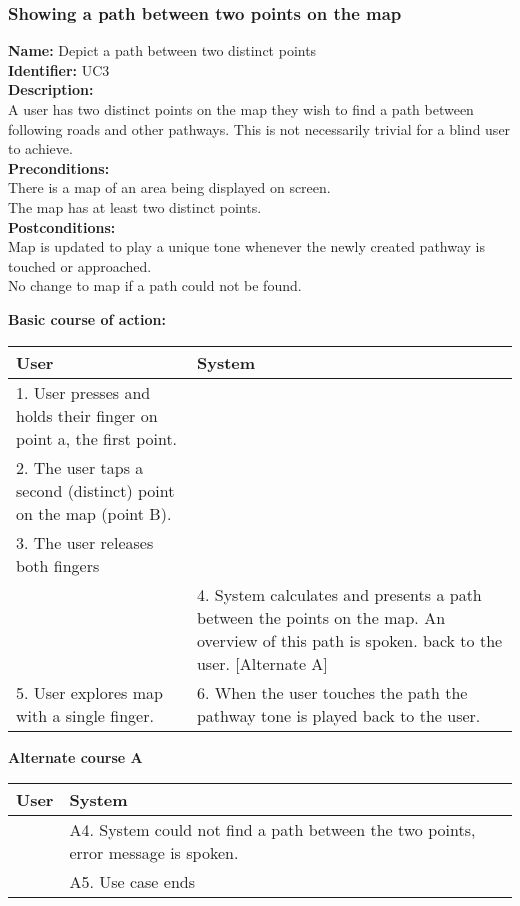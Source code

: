 \documentclass[11pt,twoside,a4paper]{article}
\begin{document}
\subsubsection{Showing a path between two points on the map}
\noindent
\textbf{Name:} Depict a path between two distinct points\\
\textbf{Identifier:} UC3\\
\textbf{Description:}\\
A user has two distinct points on the map they wish to find a path
between following roads and other pathways. This is not necessarily
trivial for a blind user to achieve.\\
\textbf{Preconditions:}\\
There is a map of an area being displayed on screen.\\
The map has at least two distinct points.\\
\textbf{Postconditions:}\\
Map is updated to play a unique tone whenever the newly created pathway
is touched or approached.\\
No change to map if a path could not be found.

\noindent
\textbf{Basic course of action:}\\
\begin{tabularx}{\textwidth}{ |X|X| }
  \textbf{User} & \textbf{System}\\
  \hline
  1. User presses and holds their finger on point a, the first point. &
  \\
  \hline
  2. The user taps a second (distinct) point on the map (point B). & \\
  \hline
  3. The user releases both fingers & \\
  \hline
  & 4. System calculates and presents a path between the points on the
  map. An overview of this path is spoken. back to the user. [Alternate A]\\
  \hline
  5. User explores map with a single finger. & 6. When the user touches
  the path the pathway tone is played back to the user.\\
  \hline
\end{tabularx}

\noindent
\textbf{Alternate course A}\\
\begin{tabularx}{\textwidth}{ |X|X| }
  \textbf{User} & \textbf{System}\\
  \hline
  & A4. System could not find a path between the two points, error
  message is spoken.\\
  \hline
  & A5. Use case ends\\
  \hline
\end{tabularx}
\end{document}
